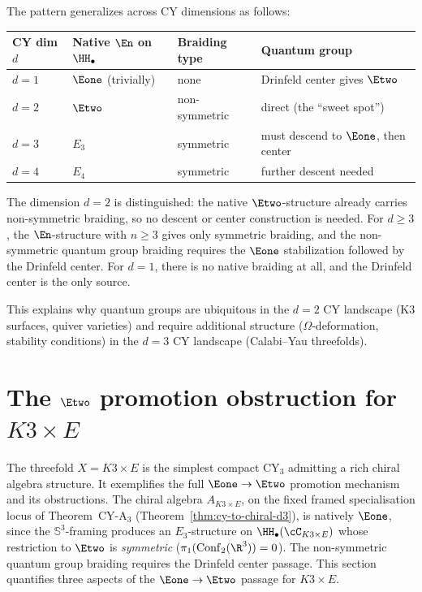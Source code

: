 \begin{remark}
\label{rem:en-circle-cy}
The pattern generalizes across CY dimensions as follows:
\begin{center}
\begin{tabular}{llll}
\toprule
CY dim $d$ & Native $\En$ on $\HH_\bullet$ & Braiding type & Quantum group \\
\midrule
$d = 1$ & $\Eone$ (trivially) & none & Drinfeld center gives $\Etwo$ \\
$d = 2$ & $\Etwo$ & non-symmetric & direct (the ``sweet spot'') \\
$d = 3$ & $E_3$ & symmetric & must descend to $\Eone$, then center \\
$d = 4$ & $E_4$ & symmetric & further descent needed \\
\bottomrule
\end{tabular}
\end{center}
The dimension $d = 2$ is distinguished: the native $\Etwo$-structure
already carries non-symmetric braiding, so no descent or center
construction is needed. For $d \geq 3$, the $\En$-structure
with $n \geq 3$ gives only symmetric braiding, and the
non-symmetric quantum group braiding requires the $\Eone$
stabilization followed by the Drinfeld center. For $d = 1$,
there is no native braiding at all, and the Drinfeld center is
the only source.

This explains why quantum groups are ubiquitous in
the $d = 2$ CY landscape (K3 surfaces, quiver varieties) and
require additional structure ($\Omega$-deformation, stability
conditions) in the $d = 3$ CY landscape (Calabi--Yau threefolds).
\end{remark}


\section{The \texorpdfstring{$\Etwo$}{E2} promotion obstruction for \texorpdfstring{$K3 \times E$}{K3 x E}}
\label{sec:k3e-e2-promotion}

The threefold $X = K3 \times E$ is the simplest compact CY$_3$
admitting a rich chiral algebra structure. It exemplifies the
full $\Eone \to \Etwo$ promotion mechanism and its obstructions.
The chiral algebra \(A_{K3 \times E}\), on the fixed framed
specialisation locus of Theorem~CY-A$_3$
(Theorem~\ref{thm:cy-to-chiral-d3}), is natively $\Eone$, since the
$\mathbb{S}^3$-framing
produces an $E_3$-structure on $\HH_\bullet(\cC_{K3 \times E})$
whose restriction to $\Etwo$ is \emph{symmetric}
($\pi_1(\mathrm{Conf}_2(\R^3)) = 0$). The non-symmetric quantum
group braiding requires the Drinfeld center passage. This section
quantifies three aspects of the $\Eone \to \Etwo$ passage
for $K3 \times E$.


